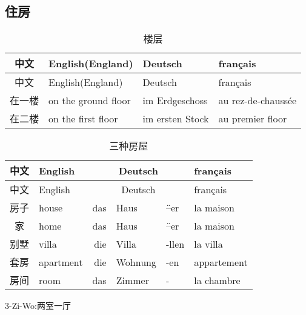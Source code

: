 \documentclass[12pt,A4paper,oneside,reqno]{amsart}
\numberwithin{equation}{section}
\theoremstyle{plain}
\theoremstyle{plain}
\theoremstyle{plain}
\numberwithin{equation}{section}
\theoremstyle{remark}
\begin{document}
\subsection{住房}\hspace{1cm}
\begin{longtable}{c|l|l|l}
	\hline
	中文	&	English(England)	&	Deutsch	&	français	\\
	\hline
	\endhead
	\hline
	中文	&	English(England)	&	Deutsch	&	français	\\
	\hline
	\endfirsthead	
	\hline
	\endfoot
	\hline	
	\caption{楼层}
	\endlastfoot				
在一楼	&	on the ground floor	&	im Erdgeschoss	&	au rez-de-chauss\'{e}e	\\
在二楼	&	on the first floor	&	im ersten Stock	&	au premier floor	\\


	
\end{longtable}
\begin{longtable}{c|l|rll|l}
	\hline
	中文	&	English	&\multicolumn{3}{c|}{Deutsch} &	français  	\\
	\hline
	\endhead
	\hline
	中文	&	English	&\multicolumn{3}{c|}{Deutsch} &	français  	\\
	\hline
	\endfirsthead	
	\hline
	\endfoot
	\hline	
	\caption{三种房屋}
	\endlastfoot				
房子	&	house	&	das	&	Haus	&	\"{--}er	&	la maison	\\
家	&	home	&	das	&	Haus	&	\"{--}er	&	la maison	\\
别墅	&	villa	&	die	&	Villa	&	-llen	&	la villa	\\
套房	&	apartment	&	die	&	Wohnung	&	-en	&	appartement	\\
房间	&	room	&	das	&	Zimmer	&	-	&	la chambre	\\



	
\end{longtable}
3-Zi-Wo:两室一厅
\end{document}
